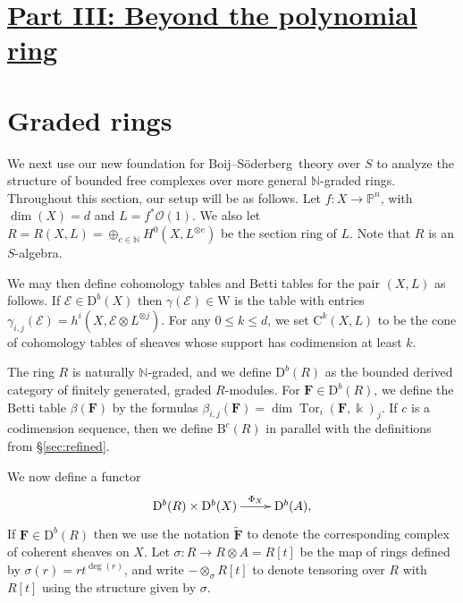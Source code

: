 \documentclass[12pt]{amsart}
\theoremstyle{definition}
\theoremstyle{remark}
\newcommand{\Tor}{\operatorname{Tor}}
\newcommand{\kk}{\Bbbk}
\newcommand{\PP}{\mathbb{P}}
\newcommand{\WW}{\mathrm{W}}
\newcommand{\NN}{\mathbb{N}}
\newcommand{\bb}{c}
\newcommand{\cO}{\mathcal{O}}
\newcommand{\cE}{\mathcal{E}}
\newcommand{\FF}{\mathbf{F}}
\newcommand{\DD}{\mathrm{D}}
\newcommand{\CQ}{\mathrm{C}}
\newcommand{\BBQ}{\mathrm{B}}
\def\BS{Boij--S\"oderberg~}
\begin{document}
\section*{\underline{{Part III: Beyond the polynomial ring}}}
\section{Graded rings}\label{sec:functor}
We next use our new foundation for \BS theory over $S$ to analyze the structure of bounded free complexes over more general $\NN$-graded rings.  Throughout this section, our setup will be as follows.  Let $f\colon X\to \PP^n$, with $\dim(X)=d$ and $L=f^*\cO(1)$.  We also let $R=R(X,L)=\oplus_{e\in \mathbb N} H^0(X,L^{\otimes e})$ be the section ring of $L$.  Note that $R$ is an $S$-algebra.

We may then define cohomology tables and Betti tables for the pair $(X,L)$ as follows. If $\cE\in \DD^b(X)$ then $\gamma(\cE)\in \WW$ is the table with entries $\gamma_{i,j}(\cE)=h^i(X,\cE\otimes L^{\otimes j})$.  For any $0\leq k \leq d$, we set $\CQ^{k}(X,L)$ to be the cone of cohomology tables of sheaves whose support has codimension at least $k$.

The ring $R$ is naturally $\NN$-graded, and we define $\DD^b(R)$ as the bounded derived category of finitely generated, graded $R$-modules.  For $\FF\in \DD^b(R)$, we define the Betti table $\beta(\FF)$ by the formulas $\beta_{i,j}(\FF)=\dim \Tor_i(\FF,\kk)_j$.  If $\bb$ is a codimension sequence, then we define $\BBQ^{\bb}(R)$ in parallel with the definitions from \S\ref{sec:refined}.

We now define a functor
\[
\xymatrix{\DD^{b}(R)\times \DD^{b}(X)  \ar[r]^-{\Phi_X}&\DD^{b}(A),}
\]
If $\FF \in \DD^b(R)$ then we use the notation $\widetilde{\FF}$ to denote the corresponding complex of coherent sheaves on $X$.
Let $\sigma: R\to R\otimes A=R[t]$ be the map of rings defined by $\sigma(r)=rt^{\deg(r)}$, and
write $-\otimes_\sigma R[t]$ to denote tensoring over $R$ with $R[t]$ using the structure
given by $\sigma$. 
\end{document}
